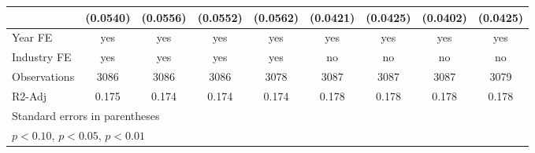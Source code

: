 \begin{table}[htbp]
\begin{tabular}{l*{8}{c}}
                    &    (0.0540)         &    (0.0556)         &    (0.0552)         &    (0.0562)         &    (0.0421)         &    (0.0425)         &    (0.0402)         &    (0.0425)         \\
\hline
Year FE             &         yes         &         yes         &         yes         &         yes         &         yes         &         yes         &         yes         &         yes         \\
Industry FE         &         yes         &         yes         &         yes         &         yes         &          no         &          no         &          no         &          no         \\
Observations        &        3086         &        3086         &        3086         &        3078         &        3087         &        3087         &        3087         &        3079         \\
R2-Adj              &       0.175         &       0.174         &       0.174         &       0.174         &       0.178         &       0.178         &       0.178         &       0.178         \\
\hline\hline
\multicolumn{9}{l}{\footnotesize Standard errors in parentheses}\\
\multicolumn{9}{l}{\footnotesize \sym{*} \(p<0.10\), \sym{**} \(p<0.05\), \sym{***} \(p<0.01\)}\\
\end{tabular}
\end{table}
